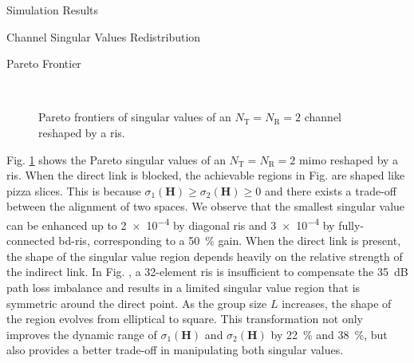 \documentclass[journal]{IEEEtran}
\begin{document}
\begin{section}{Simulation Results}
	\begin{subsection}{Channel Singular Values Redistribution}
		\begin{subsubsection}{Pareto Frontier}
			\begin{figure}[!t]
				\centering
				\\
				\caption{Pareto frontiers of singular values of an $N_\mathrm{T}=N_\mathrm{R}=2$ channel reshaped by a \gls{ris}.}
				\label{fg:singular_pareto}
			\end{figure}
			Fig. \ref{fg:singular_pareto} shows the Pareto singular values of an $N_\mathrm{T}=N_\mathrm{R}=2$ \gls{mimo} reshaped by a \gls{ris}.
			When the direct link is blocked, the achievable regions in Fig.  are shaped like pizza slices.
			This is because $\sigma_1(\mathbf{H}) \ge \sigma_2(\mathbf{H}) \ge 0$ and there exists a trade-off between the alignment of two spaces.
			We observe that the smallest singular value can be enhanced up to \num{2e-4} by diagonal \gls{ris} and \num{3e-4} by fully-connected \gls{bd}-\gls{ris}, corresponding to a \qty{50}{\percent} gain.
			When the direct link is present, the shape of the singular value region depends heavily on the relative strength of the indirect link.
			In Fig. , a 32-element \gls{ris} is insufficient to compensate the \qty{35}{dB} path loss imbalance and results in a limited singular value region that is symmetric around the direct point.
			As the group size $L$ increases, the shape of the region evolves from elliptical to square.
			This transformation not only improves the dynamic range of $\sigma_1(\mathbf{H})$ and $\sigma_2(\mathbf{H})$ by \qty{22}{\percent} and \qty{38}{\percent}, but also provides a better trade-off in manipulating both singular values.

\end{subsubsection}
\end{subsection}
\end{section}
\end{document}
